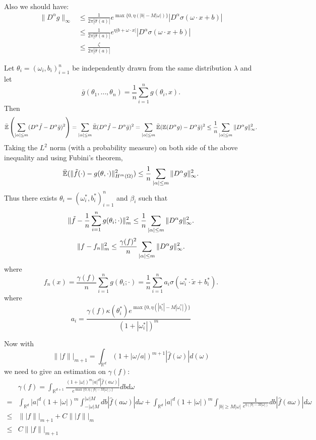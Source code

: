 Also we should have:
\begin{equation*}
	\begin{aligned}
		\|D^\alpha g\|_{\infty}&\le \frac{1}{2\pi|\hat{\sigma}(a)|}e^{\max\{0,\eta(|b|-M|\omega|)\}}|D^\alpha\sigma(\omega\cdot x+b)|\\
		&\le\frac{1}{2\pi|\hat{\sigma}(a)|}e^{\eta|b+\omega\cdot x|}|D^\alpha\sigma(\omega\cdot x+b)|\\
		&\le\frac{\zeta}{2\pi|\hat{\sigma}(a)|}
	\end{aligned}
\end{equation*}


Let $\theta_i=(\omega_i,b_i)_{i=1}^n$ be independently drawn from the same distribution $\lambda$ and let 
$$
\bar g(\theta_1,\ldots,\theta_n)
=\frac{1}{n} \sum_{i=1}^ng(\theta_i, x).
$$
Then
$$
\bar{\mathbb E} \left(\sum_{|\alpha|\le m}(D^\alpha \tilde f-D^\alpha \bar
g)^2\right) 
=\sum_{|\alpha|\le m}\bar{\mathbb E} (D^\alpha \tilde f-D^\alpha \bar g)^2
=\sum_{|\alpha|\le m}\bar{\mathbb E} (\mathbb E(D^\alpha g)-D^\alpha \bar g)^2 
\le{1\over n}\sum_{|\alpha|\le m}\|D^\alpha g\|_\infty^2.
$$
Taking the $L^2$ norm (with a probability measure) on both side of the above inequality
and using Fubini's theorem,
\begin{equation}
	\mathbb{\bar{\mathbb{E}}}(\|\tilde f(\cdot)-g(\theta,\cdot)\|^2_{H^m(\Omega)})
	\le{1\over n}\sum_{|\alpha|\le m}\|D^\alpha g\|_\infty^2.
\end{equation}
Thus there exists $\theta_i=(\omega_i^*,b_i^*)_{i=1}^n$ and $\beta_i$ such that 
$$
\|\tilde f-\frac{1}{n}\sum_{i=1}^{n} g(\theta_i; \cdot)\|_m^2
\le{1\over n}\sum_{|\alpha|\le m}\|D^\alpha g\|_\infty^2.
$$
$$
\|f-f_n\|_m^2
\le{\gamma(f)^2\over n}
\sum_{|\alpha|\le m}\|D^\alpha g\|_\infty^2.
$$
where
$$
f_n(x)=\frac{\gamma(f)}{n}\sum_{i=1}^{n} g(\theta_i; \cdot)=\frac{1}{n} \sum_{i=1}^n a_i\sigma(\omega_i^*\cdot\tilde{x}+b_i^*).
$$
where 
$$
a_i= \frac{\gamma(f)\kappa(\theta_i^*)e^{\max\{0,\eta(|b_i^*|-M|\omega_i^*|)\}}}{(1+|\omega_i^*|)^m}
$$

Now with
$$
\||f\||_{m+1} = \int_{\mathbb{R}^d}(1+|\omega/a|)^{m+1} |\hat{f}(\omega)|d(\omega)
$$
we need to give an estimation on $\gamma(f)$:
\begin{equation}
	\begin{aligned}
		&\gamma(f)=\int_{\mathbb{R}^{d+1}}\frac{(1+|\omega|)^m|a|^d|\hat{f}(a\omega)|}{e^{\max\{0,\eta(|b|-M|\omega|)\}}}dbd\omega\\
		=&\int_{\mathbb{R}^d}|a|^d(1+|\omega|)^m \int_{-|\omega|M}^{|\omega|M}db |\hat{f}(a\omega)|d\omega + \int_{\mathbb{R}^d}|a|^d(1+|\omega|)^m \int_{|b|\ge M|\omega|}\frac{1}{e^{\eta(|b|-M|\omega|)}}db |\hat{f}(a\omega)|d\omega  \\
		\le&\||f\||_{m+1}+C\||f\||_{m}\\
		\le&C\||f\||_{m+1}
	\end{aligned}
\end{equation}











